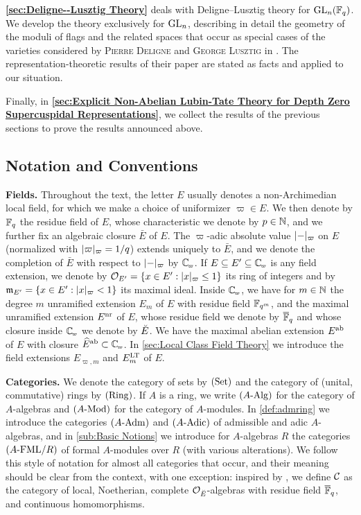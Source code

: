 \documentclass[../main.tex]{subfiles}
\begin{document}
\textbf{\cref{sec:Deligne--Lusztig Theory}} deals with Deligne--Lusztig theory
for $\operatorname{GL}_n(\mathbb{F}_q)$. 
We develop the theory exclusively for $\operatorname{GL}_n$, describing in detail the 
geometry of the moduli of flags and the related spaces that occur as 
special cases of the varieties considered by 
\textsc{Pierre Deligne} and \textsc{George Lusztig} in
\cite{delignelusztig1976}. The representation-theoretic results of their paper
are stated as facts and applied to our situation.

Finally, in \textbf{\cref{sec:Explicit Non-Abelian Lubin-Tate Theory for Depth
Zero Supercuspidal Representations}}, we collect the results of the
previous sections to prove the results announced above. 

\subsection*{Notation and Conventions} %

\textbf{Fields.} Throughout the text, the letter $E$ usually denotes
a non-Archimedian local field, for which we make a choice of uniformizer
$\varpi \in E$. We then denote by $\mathbb{F}_q$ the residue
field of $E$, whose characteristic we denote by $p \in \mathbb{N}$, and we further fix
an algebraic closure $\bar E$ of $E$. The $\varpi$-adic absolute value $\lvert - \rvert_\varpi$ on $E$ (normalized with $\lvert \varpi \rvert_\varpi = 1/q$) extends uniquely
to $\bar E$, and we denote the completion of $\bar E$ with respect to $\lvert - \rvert_\varpi$ by $\Cp$. If $E \subseteq E' \subseteq \Cp$ is any
field extension, we denote by $\mathcal{O}_{E'} = \{x \in E' : \lvert x \rvert_\varpi \leq 1\}$
its ring of integers and by $\mathfrak{m}_{E'} = \{x \in E' : \lvert x \rvert_{\varpi} < 1\}$ its
maximal ideal. Inside $\Cp$, we have for $m\in \mathbb{N}$ the degree $m$ unramified
extension $E_m$ of $E$ with residue field $\mathbb{F}_{q^m}$, and the maximal unramified extension
$E^{\mathrm{nr}}$ of $E$, whose residue field we denote by ${\overline {\mathbb{F}}_q}$ and whose closure
inside $\Cp$ we denote by ${\breve {E}}$. We have the maximal abelian extension $E^{\mathrm{ab}}$ of 
$E$ with closure $\hat E^\ab \subset \Cp$. In \cref{sec:Local Class Field Theory} we 
introduce the field extensions $E_{\varpi, m}$ and $E^{\mathrm{LT}}_m$ of $E$.

\textbf{Categories.} 
We denote the category of sets by ${(\mathrm{Set})}$ and the category of (unital,
commutative) rings by ${(\mathrm{Ring})}$. If $A$ is a ring, we write ${({A}\textnormal-\allowbreak\mathrm{Alg})}$ for the
category of $A$-algebras and ${({A}\textnormal-\allowbreak\mathrm{Mod})}$ for the category of $A$-modules.
In \cref{def:admring} we introduce the categories ${({A}\textnormal-\allowbreak\mathrm{Adm})}$ and ${({A}\textnormal-\allowbreak\mathrm{Adic})}$ of 
admissible and adic $A$-algebras, and in \cref{sub:Basic Notions} we introduce
for $A$-algebras $R$ the categories ${({A}\textnormal-\allowbreak\mathrm{FML}/{R})}$ of formal $A$-modules over $R$
(with various alterations). We follow this style of notation for almost all categories
that occur, and their meaning should be clear from the context, with one exception:
inspired by \cite{drinfel1974elliptic}, we define $\mathcal{C}$ as the category of
local, Noetherian, complete $\mathcal{O}_{\breve {E}}$-algebras with residue field ${\overline {\mathbb{F}}_q}$,
and continuous homomorphisms.
\end{document}
